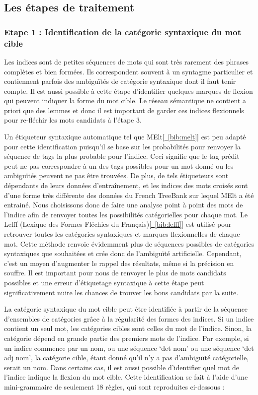 \subsection{Les étapes de traitement}

\subsubsection{Etape 1 : Identification de la catégorie syntaxique du mot cible}%
Les indices sont de petites séquences de mots qui sont très rarement des phrases complètes et bien formées. Ils correspondent souvent à un syntagme particulier et contiennent parfois des ambiguïtés de catégorie syntaxique dont il faut tenir compte. Il est aussi possible à cette étape d'identifier quelques marques de flexion qui peuvent indiquer la forme du mot cible. Le réseau sémantique ne contient a priori que des lemmes et donc il est important de garder ces indices flexionnels pour re-fléchir les mots candidats à l'étape 3. %

Un étiqueteur syntaxique automatique tel que MElt[\hyperref[bib:melt]{~\ref*{bib:melt}}] est peu adapté pour cette identification puisqu'il se base sur les probabilités pour renvoyer la séquence de tags la plus probable pour l'indice. Ceci signifie que le tag prédit peut ne pas correspondre à un des tags possibles pour un mot donné ou les ambiguïtés peuvent ne pas être trouvées. De plus, de tels étiqueteurs sont dépendants de leurs données d'entraînement, et les indices des mots croisés sont d'une forme très différente des données du French TreeBank sur lequel MElt a été entrainé. Nous choisissons donc de faire une analyse point à point des mots de l'indice afin de renvoyer toutes les possibilités catégorielles pour chaque mot. Le Lefff (Lexique des Formes Fléchies du Français)[\hyperref[bib:lefff]{~\ref*{bib:lefff}}] est utilisé pour retrouver toutes les catégories syntaxiques et marques flexionnelles de chaque mot. Cette méthode renvoie évidemment plus de séquences possibles de catégories syntaxiques que souhaitées et crée donc de l'ambiguïté artificielle. Cependant, c'est un moyen d'augmenter le rappel des résultats, même si la précision en souffre. Il est important pour nous de renvoyer le plus de mots candidats possibles et une erreur d'étiquetage syntaxique à cette étape peut significativement nuire les chances de trouver les bons candidats par la suite.

La catégorie syntaxique du mot cible peut être identifiée à partir de la séquence d'ensembles de catégories grâce à la régularité des formes des indices. Si un indice contient un seul mot, les catégories cibles sont celles du mot de l'indice. Sinon, la catégorie dépend en grande partie des premiers mots de l'indice. Par exemple, si un indice commence par un nom, ou une séquence \lq{det nom}\rq{} ou une séquence \lq{det adj nom}\rq{}, la catégorie cible, étant donné qu'il n'y a pas d'ambiguïté catégorielle, serait un nom. Dans certains cas, il est aussi possible d'identifier quel mot de l'indice indique la flexion du mot cible. Cette identification se fait à l'aide d'une mini-grammaire de seulement 18 règles, qui sont reproduites ci-dessous :

